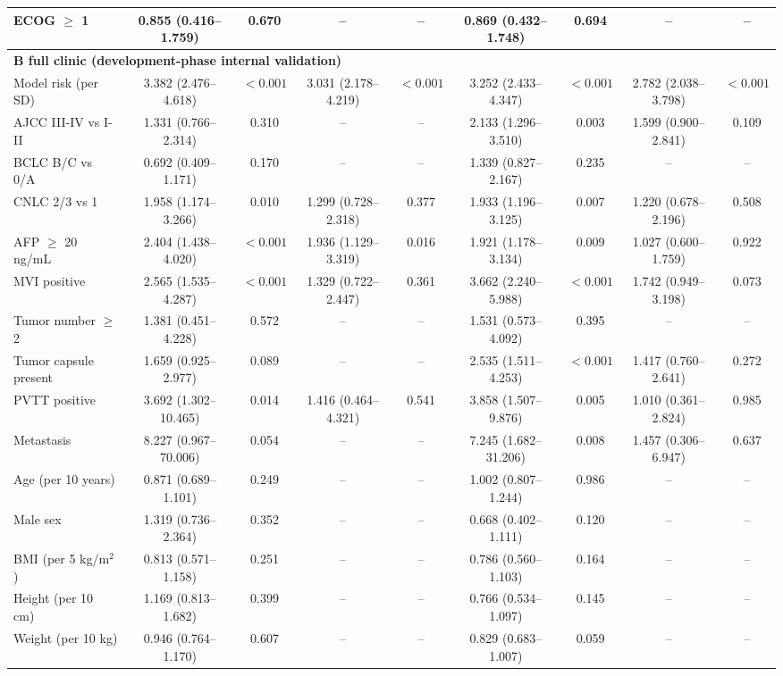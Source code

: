 \begin{table}[!htbp]
{\begin{tabular}{lcccccccc}
ECOG $\geq$ 1 & 0.855 (0.416--1.759) & 0.670 & -- & -- & 0.869 (0.432--1.748) & 0.694 & -- & -- \\
\midrule
\multicolumn{9}{l}{\textbf{B full clinic (development-phase internal validation)}} \\
Model risk (per SD) & 3.382 (2.476--4.618) & $<0.001$ & 3.031 (2.178--4.219) & $<0.001$ & 3.252 (2.433--4.347) & $<0.001$ & 2.782 (2.038--3.798) & $<0.001$ \\
AJCC III-IV vs I-II & 1.331 (0.766--2.314) & 0.310 & -- & -- & 2.133 (1.296--3.510) & 0.003 & 1.599 (0.900--2.841) & 0.109 \\
BCLC B/C vs 0/A & 0.692 (0.409--1.171) & 0.170 & -- & -- & 1.339 (0.827--2.167) & 0.235 & -- & -- \\
CNLC 2/3 vs 1 & 1.958 (1.174--3.266) & 0.010 & 1.299 (0.728--2.318) & 0.377 & 1.933 (1.196--3.125) & 0.007 & 1.220 (0.678--2.196) & 0.508 \\
AFP $\geq$ 20 ng/mL & 2.404 (1.438--4.020) & $<0.001$ & 1.936 (1.129--3.319) & 0.016 & 1.921 (1.178--3.134) & 0.009 & 1.027 (0.600--1.759) & 0.922 \\
MVI positive & 2.565 (1.535--4.287) & $<0.001$ & 1.329 (0.722--2.447) & 0.361 & 3.662 (2.240--5.988) & $<0.001$ & 1.742 (0.949--3.198) & 0.073 \\
Tumor number $\geq$ 2 & 1.381 (0.451--4.228) & 0.572 & -- & -- & 1.531 (0.573--4.092) & 0.395 & -- & -- \\
Tumor capsule present & 1.659 (0.925--2.977) & 0.089 & -- & -- & 2.535 (1.511--4.253) & $<0.001$ & 1.417 (0.760--2.641) & 0.272 \\
PVTT positive & 3.692 (1.302--10.465) & 0.014 & 1.416 (0.464--4.321) & 0.541 & 3.858 (1.507--9.876) & 0.005 & 1.010 (0.361--2.824) & 0.985 \\
Metastasis & 8.227 (0.967--70.006) & 0.054 & -- & -- & 7.245 (1.682--31.206) & 0.008 & 1.457 (0.306--6.947) & 0.637 \\
Age (per 10 years) & 0.871 (0.689--1.101) & 0.249 & -- & -- & 1.002 (0.807--1.244) & 0.986 & -- & -- \\
Male sex & 1.319 (0.736--2.364) & 0.352 & -- & -- & 0.668 (0.402--1.111) & 0.120 & -- & -- \\
BMI (per 5 kg/m$^2$) & 0.813 (0.571--1.158) & 0.251 & -- & -- & 0.786 (0.560--1.103) & 0.164 & -- & -- \\
Height (per 10 cm) & 1.169 (0.813--1.682) & 0.399 & -- & -- & 0.766 (0.534--1.097) & 0.145 & -- & -- \\
Weight (per 10 kg) & 0.946 (0.764--1.170) & 0.607 & -- & -- & 0.829 (0.683--1.007) & 0.059 & -- & -- \\

\end{tabular}}
\end{table}

